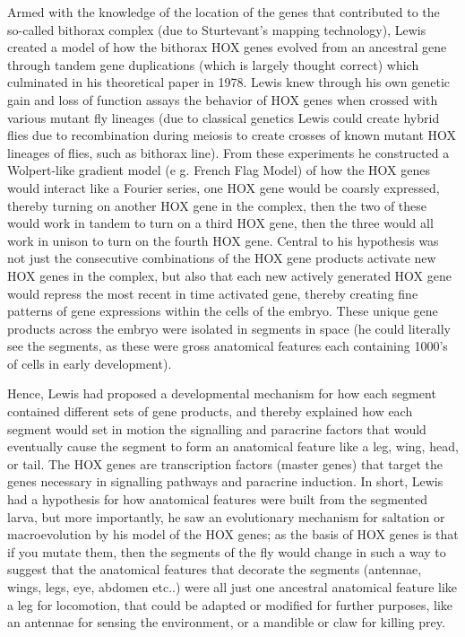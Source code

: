 Armed with the knowledge of the location of the genes that contributed to the so-called bithorax complex (due to Sturtevant's mapping technology), Lewis created a model of how the bithorax HOX genes evolved from an ancestral gene through tandem gene duplications (which is largely thought correct) which culminated in his theoretical paper in 1978\cite{pmid103000}.  Lewis knew through his own genetic gain and loss of function assays the behavior of HOX genes when crossed with various mutant fly lineages (due to classical genetics Lewis could create hybrid flies due to recombination during meiosis to create crosses of known mutant HOX lineages of flies, such as bithorax line).  From these experiments he constructed a Wolpert-like gradient model (e g. French Flag Model) of how the HOX genes would interact like a Fourier series, one HOX gene would be coarsly expressed, thereby turning on another HOX gene in the complex, then the two of these would work in tandem to turn on a third HOX gene, then the three would all work in unison to turn on the fourth HOX gene.  Central to his hypothesis was not just the consecutive combinations of the HOX gene products activate new HOX genes in the complex, but also that each new actively generated HOX gene would repress the most recent in time activated gene, thereby creating fine patterns of gene expressions within the cells of the embryo.  These unique gene products across the embryo were isolated in segments in space (he could literally see the segments, as these were gross anatomical features each containing 1000's of cells in early development).  

Hence, Lewis had proposed a developmental mechanism for how each segment contained different sets of gene products, and thereby explained how each segment would set in motion the signalling and paracrine factors that would eventually cause the segment to form an anatomical feature like a leg, wing, head, or tail.  The HOX genes are transcription factors (master genes) that target the genes necessary in signalling pathways and paracrine induction.   In short, Lewis had a hypothesis for how anatomical features were built from the segmented larva, but more importantly, he saw an evolutionary mechanism for saltation or macroevolution by his model of the HOX genes; as the basis of HOX genes is that if you mutate them, then the segments of the fly would change in such a way to suggest that the anatomical features that decorate the segments (antennae, wings, legs, eye, abdomen etc..) were all just one ancestral anatomical feature like a leg for locomotion, that could be adapted or modified for further purposes, like an antennae for sensing the environment, or a mandible or claw for killing prey.

